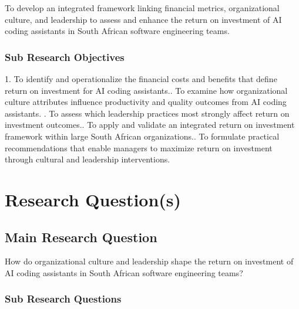 \documentclass[11pt]{report}
\begin{document}
To develop an integrated framework linking financial metrics, organizational culture, and leadership to assess and enhance the return on investment of AI coding assistants in South African software engineering teams.

\subsection{Sub Research Objectives}
\label{sec:Sub Research Objectives}

1. To identify and operationalize the financial costs and benefits that define return on investment for AI coding assistants.. To examine how organizational culture attributes influence productivity and quality outcomes from AI coding assistants. . To assess which leadership practices most strongly affect return on investment outcomes.. To apply and validate an integrated return on investment framework within large South African organizations.. To formulate practical recommendations that enable managers to maximize return on investment through cultural and leadership interventions.

\chapter*{Research Question(s)}
\section{Main Research Question}
\label{sec:Main Research Question}

How do organizational culture and leadership shape the return on investment of AI coding assistants in South African software engineering teams?

\subsection{Sub Research Questions}
\label{sec:Sub Research Questions}
\end{document}
